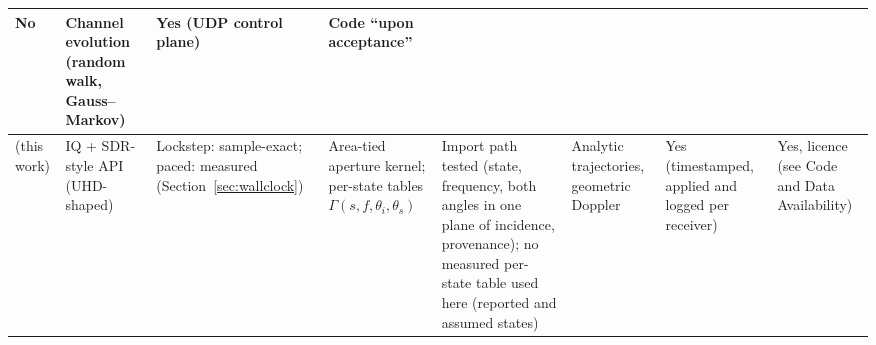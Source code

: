 \begin{table}[t]
\begin{tabular}{@{}L{1.08in}L{0.80in}L{0.72in}L{1.06in}L{0.80in}L{0.74in}L{0.82in}L{0.70in}@{}}
  No & Channel evolution (random walk, Gauss--Markov) & Yes (UDP control plane) &
  Code ``upon acceptance'' \\
\midrule
\sremu{} (this work) &
  IQ + SDR-style API (UHD-shaped) & Lockstep: sample-exact; paced: measured
  (Section~\ref{sec:wallclock}) & Area-tied aperture kernel; per-state tables
  $\Gamma(s,f,\theta_i,\theta_s)$ & Import path tested (state, frequency, both angles in one
  plane of incidence, provenance); no measured per-state table used here (reported and assumed
  states) & Analytic trajectories,
  geometric Doppler & Yes (timestamped, applied and logged per receiver) & Yes, \txtLicence{} licence (see Code and
  Data Availability) \\
\bottomrule
\end{tabular}
\end{table}
